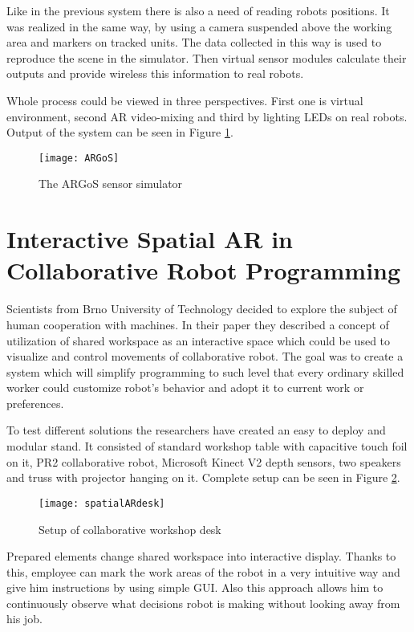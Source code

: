 \documentclass[printmode,en]{mgr}
\begin{document}
Like in the previous system there is also a need of reading robots positions. It was realized in the same way, by using a camera suspended above the working area and markers on tracked units. The data collected in this way is used to reproduce the scene in the simulator. Then virtual sensor modules calculate their outputs and provide wireless this information to real robots.

Whole process could be viewed in three perspectives. First one is virtual environment, second AR video-mixing and third by lighting LEDs on real robots. Output of the system can be seen in Figure \ref{fig:ARGoS}.

\begin{figure}[!ht]
  \centering
    \texttt{[image: ARGoS]}
  \caption{The ARGoS sensor simulator \cite{ARGoS}}
  \label{fig:ARGoS}
\end{figure}

\section{Interactive Spatial AR in Collaborative Robot Programming}
Scientists from Brno University of Technology decided to explore the subject of human cooperation with machines. In their paper \cite{SpatialARCollaborative} they described a concept of utilization of shared workspace as an interactive space which could be used to visualize and control movements of collaborative robot. The goal was to create a system which will simplify programming to such level that every ordinary skilled worker could customize robot's behavior and adopt it to current work or preferences.

To test different solutions the researchers have created an easy to deploy and modular stand. It consisted of standard workshop table with capacitive touch foil on it, PR2 collaborative robot, Microsoft Kinect V2 depth sensors, two speakers and truss with projector hanging on it. Complete setup can be seen in Figure \ref{fig:spatialARdesk}.

\begin{figure}[!ht]
  \centering
    \texttt{[image: spatialARdesk]}
  \caption{Setup of collaborative workshop desk \cite{SpatialARCollaborative}}
  \label{fig:spatialARdesk}
\end{figure}

Prepared elements change shared workspace into interactive display. Thanks to this, employee can mark the work areas of the robot in a very intuitive way and give him instructions by using simple GUI. Also this approach allows him to continuously observe what decisions robot is making without looking away from his job.
\end{document}
